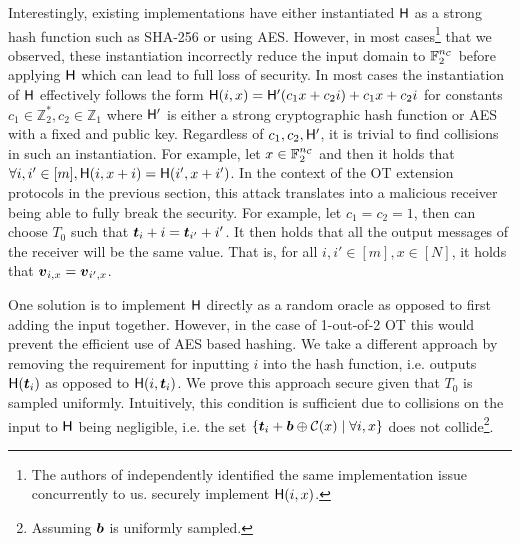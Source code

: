 Interestingly, existing implementations\cite{libOTe,encrypto,KOS,EMP} have either instantiated $\H$ as a strong hash function such as SHA-256 or using AES. However, in most cases\footnote{\label{empNote}The authors of \cite{EMP} independently identified the same implementation issue concurrently to us. \cite{EMP} securely implement $\H(i,x)$. } that we observed\cite{libOTe,encrypto,KOS}, these instantiation incorrectly reduce the input domain to $\mathbb{F}^\nc_2$ before applying $\H$ which can lead to full loss of security. In most cases the instantiation of $\H$ effectively follows the form $\H(i,x)=\H'(c_1 x + c_2 i) + c_1 x + c_2 i$ for constants $c_1\in\mathbb{Z}^*_2,c_2\in\mathbb{Z}_1$ where $\H'$ is either a strong cryptographic hash function or AES with a fixed and public key. Regardless of $c_1,c_2,\H'$, it is trivial to find collisions in such an instantiation. For example, let $x\in\mathbb{F}^\nc_2$ and then it holds that $\forall i,i'\in[m], \H(i,x+i)=\H(i', x+i')$. In the context of the OT extension protocols in the previous section, this attack translates into a malicious receiver being able to fully break the security.
\iffullversion
 For example, let $c_1=c_2=1$, then \rec can choose $T_0$ such that $\tt_i+i=\tt_{i'}+i'$. It then holds that all the output messages of the receiver will be the same value.  That is, for all $i,i'\in[m],x\in[N]$, it holds that $\vv_{i,x}=\vv_{i',x}$. 
\fi



One solution is to implement $\H$ directly as a random oracle as opposed to first adding the input together. However, in the case of 1-out-of-2 OT this would prevent the efficient use of AES based hashing. We take a different approach by removing the requirement for inputting $i$ into the hash function, i.e. \rec outputs $\H(\tt_i)$ as opposed to $\H(i,\tt_i)$. We prove this approach secure given that $T_0$ is sampled uniformly. Intuitively, this condition is sufficient due to collisions on the input to $\H$ being negligible, i.e. the set $\{\tt_i + \bb\oplus\mathcal{C}(x) \mid \forall i,x\}$ does not collide\footnote{Assuming $\bb$ is uniformly sampled.}.

